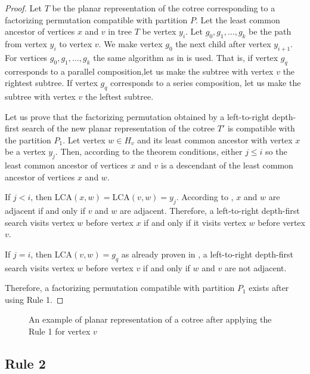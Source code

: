 \begin{proof}
Let $T$ be the planar representation of the cotree corresponding to a factorizing permutation compatible with partition $P$. Let the least common ancestor of vertices $x$ and $v$ in tree $T$ be vertex $y_i$. Let $g_0,g_1,\dots,g_k$ be the path from vertex $y_i$ to vertex $v$. We make vertex $g_0$ the next child after vertex $y_{i+1}$. For vertices $g_0,g_1,\dots,g_k$ the same algorithm as in  is used. That is, if vertex $g_q$ corresponds to a parallel composition,let us make the subtree with vertex $v$ the rightest subtree. If vertex $g_q$ corresponds to a series composition, let us make the subtree with vertex 
$v$ the leftest subtree.

Let us prove that the factorizing permutation obtained by a left-to-right depth-first search of the new planar representation of the cotree $T'$ is compatible with the partition $P_1$. Let vertex $w \in H_v$ and its least common ancestor with vertex $x$ be a vertex $y_j$. Then, according to the theorem conditions, either $j \le i$ so the least common ancestor of vertices $x$ and $v$ is a descendant of the least common ancestor of vertices $x$ and $w$.

If $j<i$, then LCA$(x,w)=$LCA$(v,w)=y_j$. According to , $x$ and $w$ are adjacent if and only if $v$ and $w$ are adjacent. Therefore, a left-to-right depth-first search visits vertex $w$ before vertex $x$ if and only if it visits vertex $w$ before vertex $v$.

If $j=i$, then LCA$(v,w)=g_q$ as already proven in , a left-to-right depth-first search visits vertex $w$ before vertex $v$ if and only if $w$ and $v$ are not adjacent.


Therefore, a factorizing permutation compatible with partition $P_1$ exists after using Rule 1.
\end{proof}

\begin{figure}
    \centering
    
    \caption{An example of planar representation of a cotree after applying the Rule 1 for vertex $v$}
    \label{fig:cograph4}
\end{figure} 



\subsection{Rule 2}

